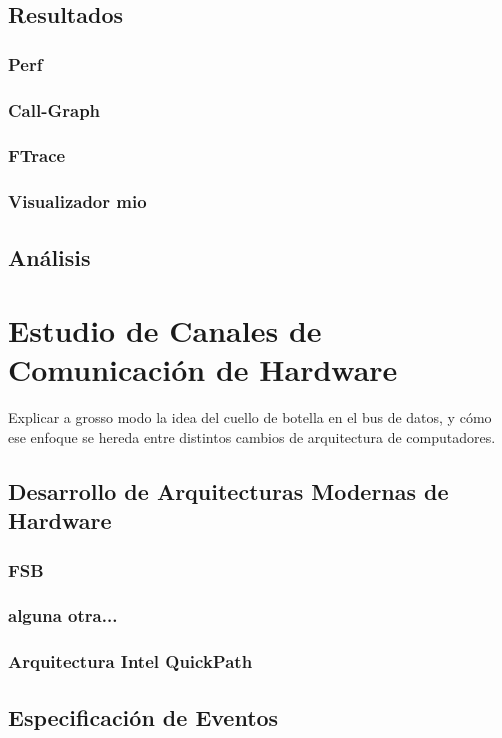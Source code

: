 \subsection{Resultados}
\subsubsection{Perf}
\subsubsection{Call-Graph}
\subsubsection{FTrace}
\subsubsection{Visualizador mio}
\subsection{Análisis}

\section{Estudio de Canales de Comunicación de Hardware}

Explicar a grosso modo la idea del cuello de botella en el bus de datos, y cómo ese enfoque se hereda entre distintos cambios de arquitectura de computadores.

\subsection{Desarrollo de Arquitecturas Modernas de Hardware}
\subsubsection{FSB}
\subsubsection{alguna otra...}
\subsubsection{Arquitectura Intel QuickPath}

\subsection{Especificación de Eventos}
